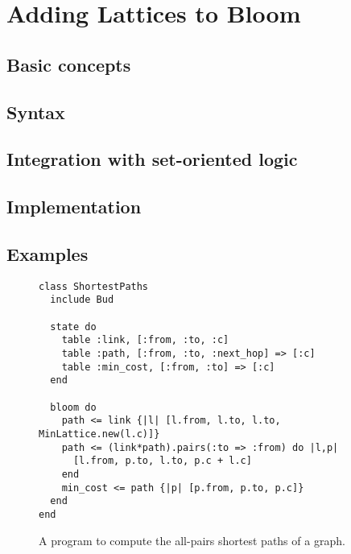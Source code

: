 \section{Adding Lattices to Bloom}
\label{sec:impl}

\subsection{Basic concepts}

\subsection{Syntax}

\subsection{Integration with set-oriented logic}

\subsection{Implementation}

\subsection{Examples}

\begin{figure}[t]
\begin{scriptsize}
\begin{lstlisting}
class ShortestPaths
  include Bud

  state do
    table :link, [:from, :to, :c]
    table :path, [:from, :to, :next_hop] => [:c]
    table :min_cost, [:from, :to] => [:c]
  end

  bloom do
    path <= link {|l| [l.from, l.to, l.to, MinLattice.new(l.c)]}
    path <= (link*path).pairs(:to => :from) do |l,p|
      [l.from, p.to, l.to, p.c + l.c]
    end
    min_cost <= path {|p| [p.from, p.to, p.c]}
  end
end
\end{lstlisting}
\end{scriptsize}
\caption{A \lang program to compute the all-pairs shortest paths of a
  graph.}
\label{fig:lattice-spaths}
\end{figure}

